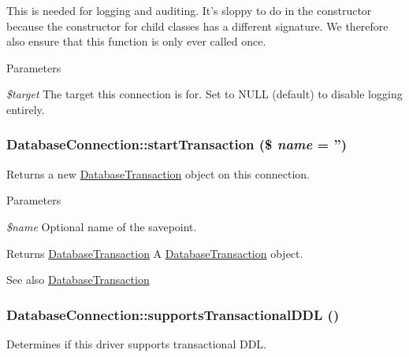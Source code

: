 This is needed for logging and auditing. It's sloppy to do in the constructor because the constructor for child classes has a different signature. We therefore also ensure that this function is only ever called once.


\begin{DoxyParams}{Parameters}
\item[{\em \$target}]The target this connection is for. Set to NULL (default) to disable logging entirely. \end{DoxyParams}
\hypertarget{classDatabaseConnection_a210f69060d31ab1559a8b2231e83a318}{
\subsubsection[{startTransaction}]{\setlength{\rightskip}{0pt plus 5cm}DatabaseConnection::startTransaction (\$ {\em name} = {\ttfamily ''})}}
\label{classDatabaseConnection_a210f69060d31ab1559a8b2231e83a318}
Returns a new \hyperlink{classDatabaseTransaction}{DatabaseTransaction} object on this connection.


\begin{DoxyParams}{Parameters}
\item[{\em \$name}]Optional name of the savepoint.\end{DoxyParams}
\begin{DoxyReturn}{Returns}
\hyperlink{classDatabaseTransaction}{DatabaseTransaction} A \hyperlink{classDatabaseTransaction}{DatabaseTransaction} object.
\end{DoxyReturn}
\begin{DoxySeeAlso}{See also}
\hyperlink{classDatabaseTransaction}{DatabaseTransaction} 
\end{DoxySeeAlso}
\hypertarget{classDatabaseConnection_a9ae6d1315a680a7250444d2aa9a3d30b}{
\subsubsection[{supportsTransactionalDDL}]{\setlength{\rightskip}{0pt plus 5cm}DatabaseConnection::supportsTransactionalDDL ()}}
\label{classDatabaseConnection_a9ae6d1315a680a7250444d2aa9a3d30b}
Determines if this driver supports transactional DDL.

